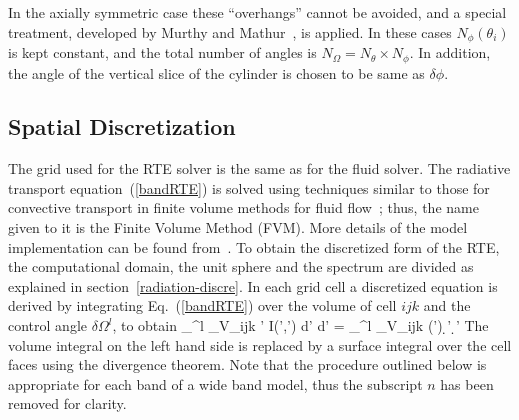 In the axially symmetric case these ``overhangs'' cannot be avoided, and a
special treatment, developed by Murthy and Mathur~\cite{Murthy}, is
applied. In these cases $N_{\phi}(\theta_i)$ is kept constant, and
the total number of angles is $N_{\Omega} = N_{\theta} \times
N_{\phi}$. In addition, the angle of the vertical slice of the cylinder is
chosen to be same as $\delta\phi$.



\subsection{Spatial Discretization}

The grid used for the RTE solver is the same as for the fluid solver.
The radiative transport equation~(\ref{bandRTE}) is solved using
techniques similar to those for convective transport in finite volume
methods for fluid flow~\cite{Raithby}; thus, the name given to it is
the Finite Volume Method (FVM). More details of the model
implementation can be found from~\cite{Hostikka:2008}.
To obtain the discretized form of the
RTE, the computational domain, the unit sphere and the spectrum are divided as explained in section~\ref{radiation-discre}.
In each grid cell a discretized equation is derived by integrating
Eq.~(\ref{bandRTE}) over the volume of cell $ijk$ and the control
angle $\delta \Omega^l$, to obtain
\be
  \int_{\delta \Omega^l} \int_{V_{ijk}}
   \bs' \cdot \nabla I(\bx',\bs') d\bx' d\bs' =
   \int_{\delta \Omega^l} \int_{V_{ijk}} \kappa(\bx') \;
    \left[ I_{b}(\bx') - I(\bx',\bs') \right] \d \bx' \d \bs'
\ee
The volume integral on the left hand side is replaced by a surface
integral over the cell faces using the divergence theorem. Note that
the procedure outlined below is appropriate for each band of a wide
band model, thus the subscript $n$ has been removed for clarity.


